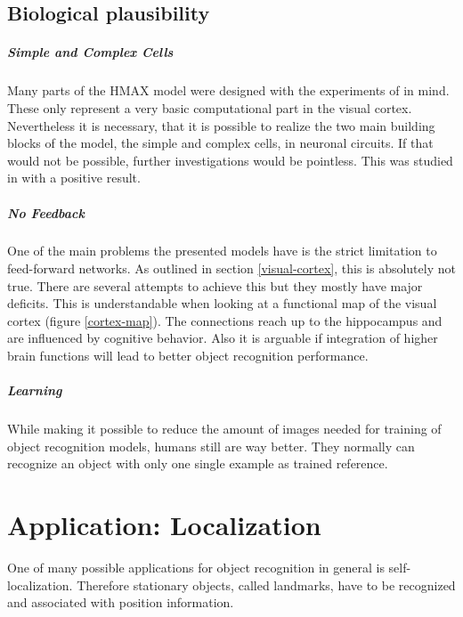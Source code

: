 	\section{Biological plausibility}
	
		\paragraph{Simple and Complex Cells} Many parts of the HMAX model were designed with the experiments of \citeauthor{hubel1962receptive} in mind. These only represent a very basic computational part in the visual cortex. Nevertheless it is necessary, that it is possible to realize the two main building blocks of the model, the simple and complex cells, in neuronal circuits. If that would not be possible, further investigations would be pointless. This was studied in \citep{serre2005theory} with a positive result.
		
		\paragraph{No Feedback} One of the main problems the presented models have is the strict limitation to feed-forward networks. As outlined in section \ref{visual-cortex}, this is absolutely not true. There are several attempts to achieve this but they mostly have major deficits. This is understandable when looking at a functional map of the visual cortex (figure \ref{cortex-map}). The connections reach up to the hippocampus and are influenced by cognitive behavior. Also it is arguable if integration of higher brain functions will lead to better object recognition performance.
		
		\paragraph{Learning} While making it possible to reduce the amount of images needed for training of object recognition models, humans still are way better. They normally can recognize an object with only one single example as trained reference.
		
\chapter{Application: Localization}

	One of many possible applications for object recognition in general is self-localization. Therefore stationary objects, called landmarks, have to be recognized and associated with position information.
	
